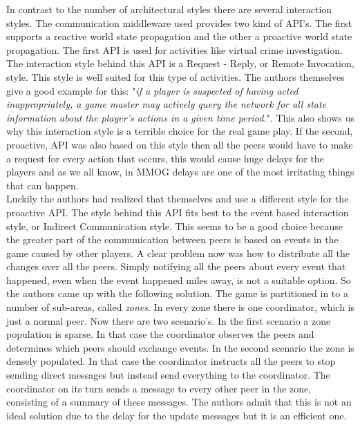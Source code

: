\indent In contrast to the number of architectural styles there are several interaction styles. The communication middleware used provides two kind of API's. The first supports a reactive world state propagation and the other a proactive world state propagation. The first API is used for activities like virtual crime investigation. The interaction style behind this API is a Request - Reply, or Remote Invocation, style. This style is well suited for this type of activities. The authors themselves give a good example for this: "\emph{if a player is suspected of having acted inappropriately, a game master may actively query the network for all state information about the player's actions in a given time period.}". This also shows us why this interaction style is a terrible choice for the real game play. If the second, proactive, API was also based on this style then all the peers would have to make a request for every action that occurs, this would cause huge delays for the players and as we all know, in MMOG delays are one of the most irritating things that can happen.\\
\indent Luckily the authors had realized that themselves and use a different style for the proactive API. The style behind this API fits best to the event based interaction style, or Indirect Communication style. This seems to be a good choice because the greater part of the communication between peers is based on events in the game caused by other players. A clear problem now was how to distribute all the changes over all the peers. Simply notifying all the peers about every event that happened, even when the event happened miles away, is not a suitable option. So the authors came up with the following solution. The game is partitioned in to a number of sub-areas, called \emph{zones}. In every zone there is one coordinator, which is just a normal peer. Now there are two scenario's. In the first scenario a zone population is sparse. In that case the coordinator observes the peers and determines which peers should exchange events. In the second scenario the zone is densely populated. In that case the coordinator instructs all the peers to stop sending direct messages but instead send everything to the coordinator. The coordinator on its turn sends a message to every other peer in the zone, consisting of a summary of these messages. The authors admit that this is not an ideal solution due to the delay for the update messages but it is an efficient one.\\ 
